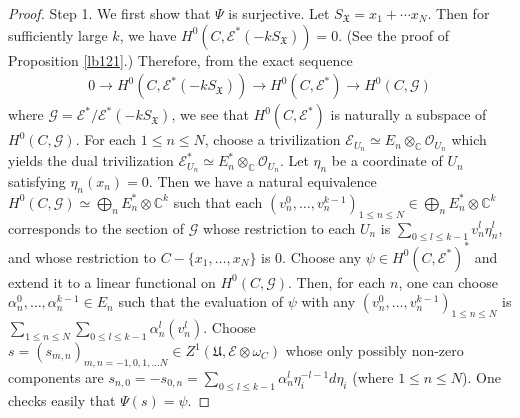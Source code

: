 \documentclass[12pt,a4paper,notitlepage]{report}
\theoremstyle{definition}
\theoremstyle{plain}
\newcommand{\fk}{\mathfrak}
\newcommand{\wtd}{\widetilde}
\newcommand{\scr}{\mathscr}
\newcommand{\SX}{S_{\fk X}}
\newcommand{\Cbb}{\mathbb C}
\numberwithin{equation}{section}
\begin{document}
\begin{proof}
Step 1. We first show that $\Psi$ is surjective. Let $\SX=x_1+\cdots x_N$. Then for sufficiently large $k$, we have $H^0(C,\scr E^*(-k\SX))=0$. (See the proof of Proposition \ref{lb121}.) Therefore, from the exact sequence
\begin{align*}
0\rightarrow H^0(C,\scr E^*(-k\SX))\rightarrow H^0(C,\scr E^*)\rightarrow H^0(C,\scr G)
\end{align*} 
where $\scr G=\scr E^*/\scr E^*(-k\SX)$, we see that $H^0(C,\scr E^*)$ is naturally a subspace of $H^0(C,\scr G)$. For each $1\leq n\leq N$, choose a trivilization $\scr E_{U_n}\simeq E_n\otimes_\Cbb\scr O_{U_n}$ which yields the dual trivilization $\scr E_{U_n}^*\simeq E_n^*\otimes_\Cbb\scr O_{U_n}$. Let $\eta_n$ be a coordinate of $U_n$ satisfying $\eta_n(x_n)=0$. Then we have a natural equivalence $H^0(C,\scr G)\simeq\bigoplus_n E_n^*\otimes \Cbb^k$ such that each  $(v_n^0,\dots,v_n^{k-1})_{1\leq n\leq N}\in \bigoplus_n E_n^*\otimes \Cbb^k$   corresponds to the section of $\scr G$ whose restriction to each $U_n$ is $\sum_{0\leq l\leq k-1}v_n^l\eta_n^l$, and whose restriction to $C-\{x_1,\dots,x_N\}$ is $0$. Choose any $\psi\in H^0(C,\scr E^*)^*$ and extend it to a linear functional on $H^0(C,\scr G)$. Then, for each $n$, one can choose $\alpha_n^0,\dots,\alpha_n^{k-1}\in E_n$ such that the evaluation of $\psi$ with any $(v_n^0,\dots,v_n^{k-1})_{1\leq n\leq N}$ is $\sum_{1\leq n\leq N}\sum_{0\leq l\leq k-1}\alpha_n^l(v_n^l)$. Choose $s=(s_{m,n})_{m,n=-1,0,1,\dots N}\in Z^1(\fk U,\scr E\otimes\omega_C)$ whose only possibly non-zero components are $s_{n,0}=-s_{0,n}=\sum_{0\leq l\leq k-1}\alpha_n^l\eta_i^{-l-1}d\eta_i$ (where $1\leq n\leq N$). One checks easily that $\Psi(s)=\psi$.








\end{proof}
\end{document}
